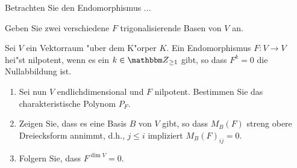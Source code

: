 \documentclass[a4,11pt]{article}
\begin{document}
\vspace*{-17mm}
{
\kopf
}


\begin{aufgabe}[4 Punkte]
  Betrachten Sie den Endomorphismus ...

  Geben Sie zwei verschiedene $F$ trigonalisierende Basen von $V$ an.
\end{aufgabe}

\begin{aufgabe}[4 Punkte]
  Sei $V$ ein Vektorraum "uber dem K"orper
  $K$. Ein Endomorphismus $F \colon V \to V$ hei"st nilpotent, wenn es
  ein $k \in \Z_{\ge 1}$ gibt, so dass $F^k=0$ die Nullabbildung ist.

\begin{enumerate}
\item Sei nun $V$ endlichdimensional und $F$ nilpotent. Bestimmen Sie
  das charakteristische Polynom $P_F$.
\item Zeigen Sie, dass es eine Basis $B$ von $V$ gibt, so dass
  $M_B(F)$ streng obere Dreiecksform annimmt, d.h., $j \leq i$ impliziert $M_B(F)_{ij} = 0$.
\item Folgern Sie, dass $F^{\dim V} = 0$.
\end{enumerate}

\end{aufgabe}


\end{document}
